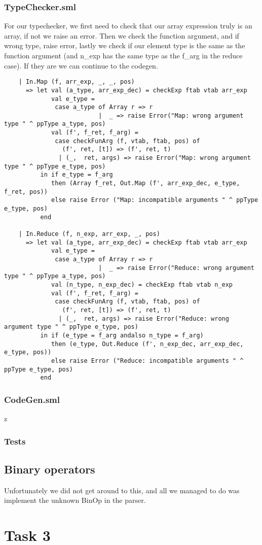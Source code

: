 \documentclass[12pt]{article}
\begin{document}
\subsubsection{TypeChecker.sml}
For our typechecker, we first need to check that our array expression truly is an array, if not we raise an error. Then we check the function argument, and if wrong type, raise error, lastly we check if our element type is the same as the function argument (and n_exp has the same type as the f_arg in the reduce case). If they are we can continue to the codegen.
\begin{verbatim}
    | In.Map (f, arr_exp, _, _, pos)
      => let val (a_type, arr_exp_dec) = checkExp ftab vtab arr_exp
             val e_type = 
              case a_type of Array r => r
                          |  _ => raise Error("Map: wrong argument type " ^ ppType a_type, pos)
             val (f', f_ret, f_arg) = 
              case checkFunArg (f, vtab, ftab, pos) of
                (f', ret, [t]) => (f', ret, t)
               | (_,  ret, args) => raise Error("Map: wrong argument type " ^ ppType e_type, pos)
          in if e_type = f_arg 
             then (Array f_ret, Out.Map (f', arr_exp_dec, e_type, f_ret, pos))
             else raise Error ("Map: incompatible arguments " ^ ppType e_type, pos)
          end
          
    | In.Reduce (f, n_exp, arr_exp, _, pos)
      => let val (a_type, arr_exp_dec) = checkExp ftab vtab arr_exp
             val e_type = 
              case a_type of Array r => r
                          |  _ => raise Error("Reduce: wrong argument type " ^ ppType a_type, pos)
             val (n_type, n_exp_dec) = checkExp ftab vtab n_exp
             val (f', f_ret, f_arg) = 
              case checkFunArg (f, vtab, ftab, pos) of
                (f', ret, [t]) => (f', ret, t)
               | (_,  ret, args) => raise Error("Reduce: wrong argument type " ^ ppType e_type, pos)
          in if (e_type = f_arg andalso n_type = f_arg)
             then (e_type, Out.Reduce (f', n_exp_dec, arr_exp_dec, e_type, pos))
             else raise Error ("Reduce: incompatible arguments " ^ ppType e_type, pos)
          end
\end{verbatim}

\clearpage
\subsubsection{CodeGen.sml}
z
\subsubsection{Tests}
\subsection{Binary operators}
Unfortunately we did not get around to this, and all we managed to do was implement the unknown BinOp in the parser.
\section{Task 3}
\end{document}
